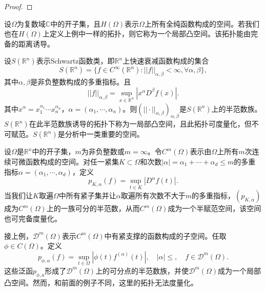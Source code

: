 \begin{proof}
	
\end{proof}

\begin{example}
	设$\Omega$为复数域$\mathbb{C}$中的开子集，且$H(\Omega)$表示$\Omega$上所有全纯函数构成的空间。若我们也在$H(\Omega)$上定义上例中一样的拓扑，则它称为一个局部凸空间。该拓扑能由完备的距离诱导。
\end{example}

\begin{example}
	设$S(\mathbb{R}^{n})$表示Schwartz函数类，即$\mathbb{R}^{n}$上快速衰减函数构成的集合
	\begin{equation*}
		S(\mathbb{R}^{n})=\{f\in C^{\infty}(\mathbb{R}^{n}):||f||_{\alpha,\beta}<\infty,\forall \alpha,\beta\},
	\end{equation*}
	其中$\alpha,\beta$是非负整数构成的多重指标。且
	\begin{equation*}
		||f||_{\alpha,\beta}=\sup_{x\in \mathbb{R}^{n}}\left|x^{\alpha}D^{\beta}f(x)\right|.
	\end{equation*}
	其中$x^{\alpha}=x_{1}^{\alpha_{1}}\cdots x_{n}^{\alpha_{n}} $，$\alpha=(\alpha_{1},\cdots,\alpha_{n}) $。则$(||\cdot||_{\alpha,\beta})_{\alpha,\beta} $是$S(\mathbb{R}^{n})$上的半范数族。$S(\mathbb{R}^{n})$在此半范数族诱导的拓扑下称为一局部凸空间，且此拓扑可度量化，但不可赋范。$S(\mathbb{R}^{n})$是分析中一类重要的空间。
\end{example}

\begin{example}
	设$\Omega$是$\mathbb{R}^{n}$中的开子集，$m$为非负整数或$m=\infty$。令$C^{m}(\Omega)$表示由$\Omega$上所有$m$次连续可微函数构成的空间。对任一紧集$K\subset\Omega$和次数$|\alpha|=\alpha_{1}+\cdots+\alpha_{d}\leq m$的多重指标$\alpha=(\alpha_{1},\cdots,\alpha_{d})$，定义
	\begin{equation*}
		p_{K,\alpha}(f)=\sup_{t\in K}|D^{\alpha}f(t)|.
	\end{equation*}
	当我们让$K$取遍$\Omega$中所有紧子集并让$\alpha$取遍所有次数不大于$m$的多重指标，$(p_{K,\alpha})$成为$C^{m}(\Omega)$上的一族可分的半范数，从而$C^{m}(\Omega)$成为一个半赋范空间，该空间也可完备度量化。
\end{example}

\begin{example}
	接上例，$\mathcal{D}^{m}(\Omega)$表示$C^{m}(\Omega)$中有紧支撑的函数构成的子空间。任取$\phi\in C(\Omega)$。定义
	\begin{equation*}
		p_{\phi,\alpha}(f)=\sup_{t\in \Omega}|\phi(t)f^{(\alpha)}(t)|,\quad |\alpha|\leq ,\quad f\in \mathcal{D}^{m}(\Omega).
	\end{equation*}
	这些泛函$p_{\phi,a}$形成了$\mathcal{D}^{m}(\Omega)$上的可分点的半范数族，并使$\mathcal{D}^{m}(\Omega)$成为一个局部凸空间。然而，和前面的例子不同，这里的拓扑无法度量化。
\end{example}

